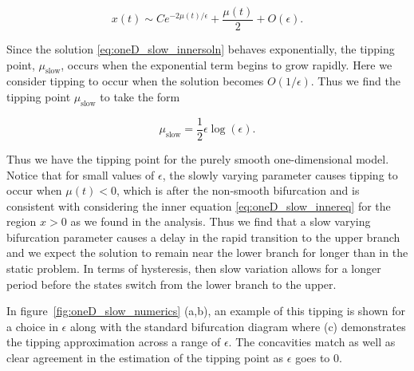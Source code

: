 \begin{equation}\label{eq:oneD_slow_innersoln}
x(t)\sim Ce^{-2\mu(t)/\epsilon}+\frac{\mu(t)}{2}+O(\epsilon).
\end{equation}

Since the solution \eqref{eq:oneD_slow_innersoln} behaves exponentially, the tipping point, $\mu_{\text{slow}}$, occurs when the exponential term begins to grow rapidly. Here we consider tipping to occur when the solution becomes $O(1/\epsilon)$. Thus we find the tipping point $\mu_{\text{slow}}$ to take the form

\begin{equation}\label{eq:oneD_slow_tipping}
\mu_{\text{slow}}= \frac{1}{2}\epsilon \log (\epsilon).
\end{equation}

Thus we have the tipping point for the purely smooth one-dimensional model. Notice that for small values of $\epsilon$, the slowly varying parameter causes tipping to occur when $\mu(t)<0$, which is after the non-smooth bifurcation and is consistent with considering the inner equation \eqref{eq:oneD_slow_innereq} for the region $x>0$ as we found in the analysis. Thus we find that a slow varying bifurcation parameter causes a delay in the rapid transition to the upper branch and we expect the solution to remain near the lower branch for longer than in the static problem. In terms of hysteresis, then slow variation allows for a longer period before the states switch from the lower branch to the upper.

In figure~\ref{fig:oneD_slow_numerics} (a,b), an example of this tipping is shown for a choice in $\epsilon$ along with the standard bifurcation diagram where (c) demonstrates the tipping approximation across a range of $\epsilon$. The concavities match as well as clear agreement in the estimation of the tipping point as $\epsilon$ goes to 0.

